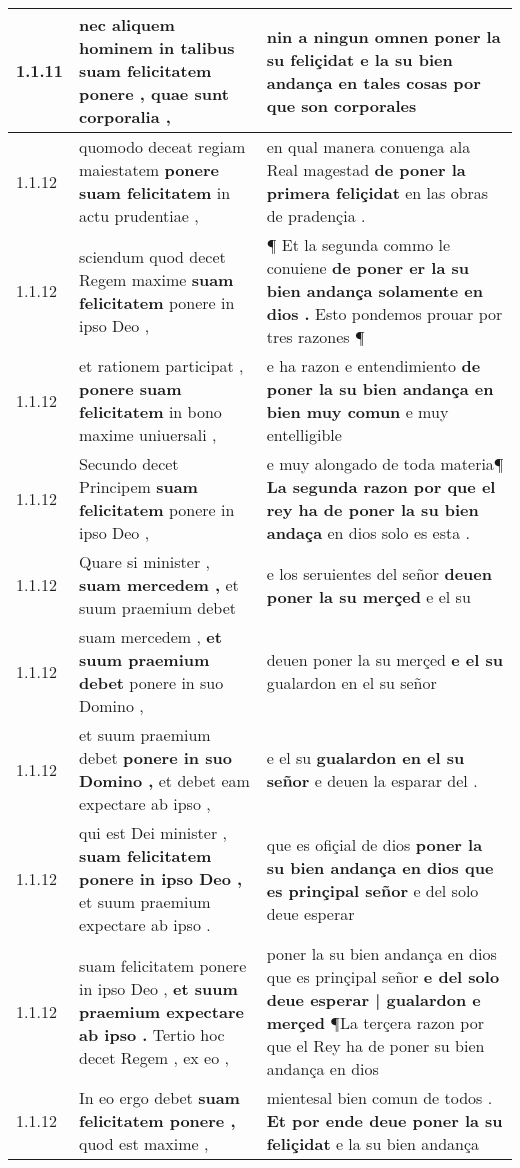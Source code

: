 \begin{tabular}{|p{1cm}|p{6.5cm}|p{6.5cm}|}
1.1.11 & nec aliquem hominem in talibus \textbf{ suam felicitatem ponere , } quae sunt corporalia , & nin a ningun omnen poner la su feliçidat \textbf{ e la su bien andança en tales cosas } por que son corporales \\\hline
1.1.12 & quomodo deceat regiam maiestatem \textbf{ ponere suam felicitatem } in actu prudentiae , & en qual manera conuenga ala Real magestad \textbf{ de poner la primera feliçidat } en las obras de pradençia . \\\hline
1.1.12 & sciendum quod decet Regem maxime \textbf{ suam felicitatem } ponere in ipso Deo , & ¶ Et la segunda commo le conuiene \textbf{ de poner er la su bien andança solamente en dios . } Esto pondemos prouar por tres razones ¶ \\\hline
1.1.12 & et rationem participat , \textbf{ ponere suam felicitatem } in bono maxime uniuersali , & e ha razon e entendimiento \textbf{ de poner la su bien andança en bien muy comun } e muy entelligible \\\hline
1.1.12 & Secundo decet Principem \textbf{ suam felicitatem } ponere in ipso Deo , & e muy alongado de toda materia¶ \textbf{ La segunda razon por que el rey ha de poner la su bien andaça } en dios solo es esta . \\\hline
1.1.12 & Quare si minister , \textbf{ suam mercedem , } et suum praemium debet & e los seruientes del señor \textbf{ deuen poner la su merçed } e el su \\\hline
1.1.12 & suam mercedem , \textbf{ et suum praemium debet } ponere in suo Domino , & deuen poner la su merçed \textbf{ e el su } gualardon en el su señor \\\hline
1.1.12 & et suum praemium debet \textbf{ ponere in suo Domino , } et debet eam expectare ab ipso , & e el su \textbf{ gualardon en el su señor } e deuen la esparar del . \\\hline
1.1.12 & qui est Dei minister , \textbf{ suam felicitatem ponere in ipso Deo , } et suum praemium expectare ab ipso . & que es ofiçial de dios \textbf{ poner la su bien andança en dios que es prinçipal señor } e del solo deue esperar \\\hline
1.1.12 & suam felicitatem ponere in ipso Deo , \textbf{ et suum praemium expectare ab ipso . } Tertio hoc decet Regem , ex eo , & poner la su bien andança en dios que es prinçipal señor \textbf{ e del solo deue esperar | gualardon e merçed } ¶La terçera razon por que el Rey ha de poner su bien andança en dios \\\hline
1.1.12 & In eo ergo debet \textbf{ suam felicitatem ponere , } quod est maxime , & mientesal bien comun de todos . \textbf{ Et por ende deue poner la su feliçidat } e la su bien andança \\\hline

\end{tabular}
